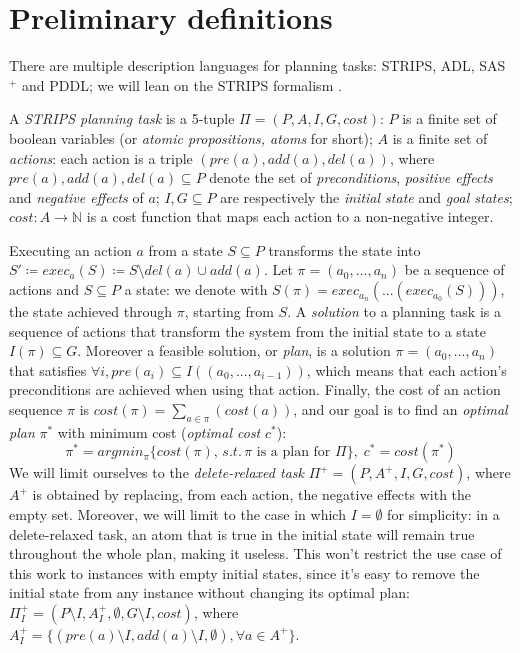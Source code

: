\section{Preliminary definitions}
There are multiple description languages for planning tasks: STRIPS, ADL, SAS$^+$ and PDDL; we will lean on the STRIPS formalism \cite{Fikes_71}.

A \textit{STRIPS planning task} is a 5-tuple $\Pi=(P,A,I,G,cost)$: $P$ is a finite set of boolean variables (or \textit{atomic propositions, atoms} for short); $A$ is a finite set of \textit{actions}: each action is a triple $(pre(a), add(a), del(a))$, where $pre(a),add(a),del(a)\subseteq P$ denote the set of \textit{preconditions}, \textit{positive effects} and \textit{negative effects} of $a$; $I,G\subseteq P$ are respectively the \textit{initial state} and \textit{goal states}; $cost:A\to\mathbb{N}$ is a cost function that maps each action to a non-negative integer.

Executing an action $a$ from a state $S\subseteq P$ transforms the state into $S'\coloneq exec_a(S)\coloneq S\setminus del(a)\cup add(a)$.
Let $\pi=(a_0,...,a_n)$ be a sequence of actions and $S\subseteq P$ a state: we denote with $S(\pi)=exec_{a_n}(...(exec_{a_0}(S)))$, the state achieved through $\pi$, starting from $S$.
A \textit{solution} to a planning task is a sequence of actions that transform the system from the initial state to a state $I(\pi)\subseteq G$. Moreover a feasible solution, or \textit{plan}, is a solution $\pi=(a_0,...,a_n)$ that satisfies $\forall i,pre(a_i)\subseteq I((a_0,...,a_{i-1}))$, which means that each action's preconditions are achieved when using that action. Finally, the cost of an action sequence $\pi$ is $cost(\pi)=\sum_{a\in\pi}(cost(a))$, and our goal is to find an \textit{optimal plan} $\pi^*$ with minimum cost (\textit{optimal cost} $c^*$): $$\pi^*=argmin_{\pi}\{{cost(\pi)},\,s.t.\,\pi\mbox{ is a plan for }\Pi\},\;c^*=cost(\pi^*)$$
We will limit ourselves to the \textit{delete-relaxed task} $\Pi^+=(P,A^+,I,G,cost)$, where $A^+$ is obtained by replacing, from each action, the negative effects with the empty set. Moreover, we will limit to the case in which $I=\emptyset$ for simplicity: in a delete-relaxed task, an atom that is true in the initial state will remain true throughout the whole plan, making it useless. This won't restrict the use case of this work to instances with empty initial states, since it's easy to remove the initial state from any instance without changing its optimal plan: $\Pi^+_I=(P\setminus I, A^+_{I}, \emptyset, G\setminus I, cost)$, where $A^+_I=\{(pre(a)\setminus I, add(a)\setminus I, \emptyset),\forall a\in A^+\}$.
